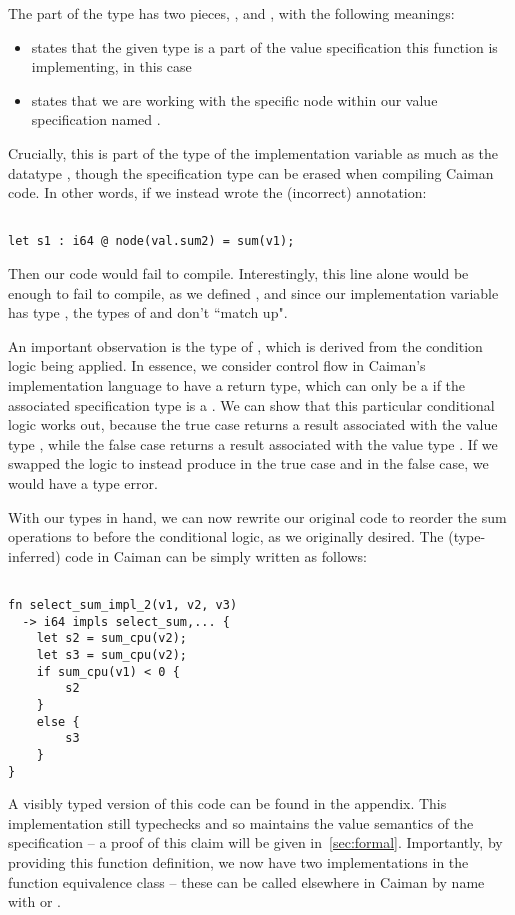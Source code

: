 The part of the type  has two pieces, , and , with the following meanings:
%
\begin{itemize}
\item {} states that the given type is a part of the value specification this function is implementing,  in this case
\item {} states that we are working with the specific node within our value specification named .
\end{itemize}
%
Crucially, this is part of the type of the implementation variable as much as the datatype , though the specification type can be erased when compiling Caiman code.  In other words, if we instead wrote the (incorrect) annotation:
%
\begin{lstlisting}

let s1 : i64 @ node(val.sum2) = sum(v1);
\end{lstlisting}
%
Then our code would fail to compile.  Interestingly, this line alone would be enough to fail to compile, as we defined , and since our implementation variable  has type , the types of  and  don't ``match up".

An important observation is the type of , which is derived from the  condition logic being applied.  In essence, we consider control flow in Caiman's implementation language to have a return type, which can only be a  if the associated specification type is a .  We can show that this particular conditional logic works out, because the true case returns a result associated with the value type , while the false case returns a result associated with the value type .  If we swapped the logic to instead produce  in the true case and  in the false case, we would have a type error.

With our types in hand, we can now rewrite our original code to reorder the sum operations to before the conditional logic, as we originally desired.  The (type-inferred) code in Caiman can be simply written as follows:
%
\begin{lstlisting}

fn select_sum_impl_2(v1, v2, v3) 
  -> i64 impls select_sum,... {
    let s2 = sum_cpu(v2);
    let s3 = sum_cpu(v2);
    if sum_cpu(v1) < 0 {
        s2
    }
    else {
        s3
    }
}
\end{lstlisting}
%
A visibly typed version of this code can be found in the appendix.  This implementation still typechecks and so maintains the value semantics of the  specification -- a proof of this claim will be given in~\ref{sec:formal}.  Importantly, by providing this function definition, we now have two implementations in the  function equivalence class -- these can be called elsewhere in Caiman by name with  or .


